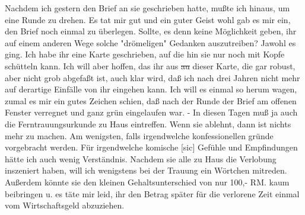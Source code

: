 \def\day{18. Mai 1944 10\begin{math}^{hmt}\end{math}}
\mktitle

Nachdem ich gestern den Brief an sie geschrieben hatte, mu{\ss}te ich hinaus, um eine Runde zu drehen.
Es tat mir gut und ein guter Geist wohl gab es mir ein, den Brief noch einmal zu \"{u}berlegen.
Sollte, es denn keine M\"{o}glichkeit geben, ihr auf einem anderen Wege solche "dr\"{o}meligen" Gedanken auszutreiben?
Jawohl es ging.
Ich habe ihr eine Karte geschrieben, auf die hin sie nur noch mit Kopfe sch\"{u}tteln kann.
Ich will aber hoffen, das ihr aus \st{au} dieser Karte, die gar robust, aber nicht grob abgefa{\ss}t ist, auch klar wird, da{\ss} ich nach drei Jahren nicht mehr auf derartige Einf\"{a}lle von ihr eingehen kann.
Ich will es einmal so herum wagen, zumal es mir ein gutes Zeichen schien, da{\ss} nach der Runde der Brief am offenen Fenster verregnet und ganz gr\"{u}n eingelaufen war.
- In diesen Tagen mu{\ss} ja auch die Ferntrauungsurkunde zu Haus eintreffen.
Wenn sie ablehnt, dann ist nichts mehr zu machen.
Am wenigsten, falls irgendwelche konfessionellen gr\"{u}nde vorgebracht werden.
F\"{u}r irgendwelche komische{\color{red} [sic] } Gef\"{u}hle und Empfindungen h\"{a}tte ich auch wenig Verst\"{a}ndnis.
Nachdem sie alle zu Haus die Verlobung inszeniert haben, will ich wenigstens bei der Trauung ein W\"{o}rtchen mitreden.
Au{\ss}erdem k\"{o}nnte sie den kleinen Gehaltsunterschied von nur 100,- RM. kaum beibringen u. es t\"{a}te mir leid, ihr den Betrag sp\"{a}ter f\"{u}r die verlorene Zeit einmal vom Wirtschaftsgeld abzuziehen.

\clearpage
